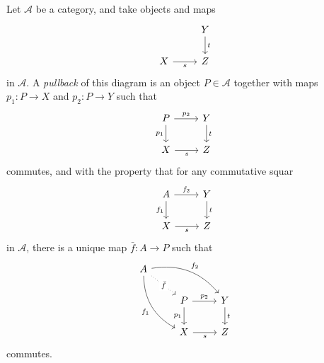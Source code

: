 \begin{definition}
  Let $\mathscr{A}$ be a category, and take objects and maps
  \begin{equation}
    \begin{tikzcd}
      & Y \arrow[d,"t"] \\
      X\arrow[r,"s"'] &Z 
    \end{tikzcd}
  \end{equation}
  in $\mathscr{A}$. A \textit{pullback} of this diagram is an object $P\in \mathscr{A}$ together with maps $p_1:P\to X$ and $p_2:P\to Y$ such that
  \begin{equation}
    \begin{tikzcd}
      P\arrow[r,"p_2"] \arrow[d,"p_1"'] &Y\arrow[d,"t"] \\
      X\arrow[r,"s"'] &Z
    \end{tikzcd}
  \end{equation}commutes, and with the property that for any commutative squar
  \begin{equation}
    \begin{tikzcd}
      A \arrow[d,"f_1"'] \arrow[r,"f_2"] &Y\arrow[d,"t"] \\
      X\arrow[r,"s"'] &Z
    \end{tikzcd}\label{pullback}
  \end{equation}in $\mathscr{A}$, there is a unique map $\bar{f}:A\to P$ such that
\begin{equation}
  \begin{tikzcd}
    A \arrow[rrd, bend left, "f_2"] \arrow[rd,dotted, "\bar{f}" description] \arrow[rdd, bend right, "f_1"'] & & \\
				    & P \arrow[r,"p_2"]\arrow[d,"p_1"']   & Y \arrow[d,"t"] \\
				    & X\arrow[r,"s"'] &Z
  \end{tikzcd}
\end{equation}
commutes. 
\end{definition}

